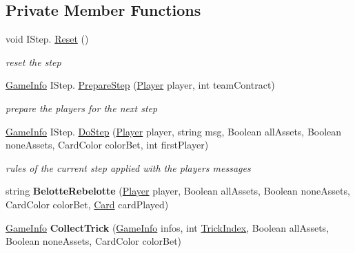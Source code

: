 \subsection*{Private Member Functions}
\begin{DoxyCompactItemize}
\item 
void I\+Step. \hyperlink{class_coinche_1_1_tricks_ade6668950abaf544373d90516821eab1}{Reset} ()
\begin{DoxyCompactList}\small\item\em reset the step \end{DoxyCompactList}\item 
\hyperlink{class_coinche_1_1_tools_1_1_game_info}{Game\+Info} I\+Step. \hyperlink{class_coinche_1_1_tricks_a7d2fedfa7e574f3570d1be83943fa953}{Prepare\+Step} (\hyperlink{class_coinche_1_1_player}{Player} player, int team\+Contract)
\begin{DoxyCompactList}\small\item\em prepare the players for the next step \end{DoxyCompactList}\item 
\hyperlink{class_coinche_1_1_tools_1_1_game_info}{Game\+Info} I\+Step. \hyperlink{class_coinche_1_1_tricks_ae9cd4602740f7612010fac07af2997a8}{Do\+Step} (\hyperlink{class_coinche_1_1_player}{Player} player, string msg, Boolean all\+Assets, Boolean none\+Assets, Card\+Color color\+Bet, int first\+Player)
\begin{DoxyCompactList}\small\item\em rules of the current step applied with the players messages \end{DoxyCompactList}\item 
\mbox{\label{class_coinche_1_1_tricks_a55a862ddde306c1f698777f51bd482f8}} 
string {\bfseries Belotte\+Rebelotte} (\hyperlink{class_coinche_1_1_player}{Player} player, Boolean all\+Assets, Boolean none\+Assets, Card\+Color color\+Bet, \hyperlink{class_coinche_1_1_card}{Card} card\+Played)
\item 
\mbox{\label{class_coinche_1_1_tricks_ac1bda0bbf8a4718f5d09b49de24a2996}} 
\hyperlink{class_coinche_1_1_tools_1_1_game_info}{Game\+Info} {\bfseries Collect\+Trick} (\hyperlink{class_coinche_1_1_tools_1_1_game_info}{Game\+Info} infos, int \hyperlink{class_coinche_1_1_tricks_a234997b0338ef3f6fe31159e789ff926}{Trick\+Index}, Boolean all\+Assets, Boolean none\+Assets, Card\+Color color\+Bet)

\end{DoxyCompactItemize}
